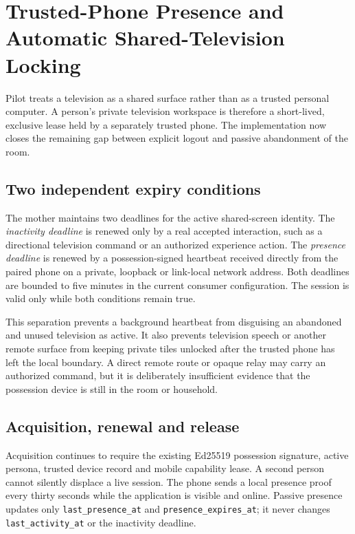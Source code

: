 \section{Trusted-Phone Presence and Automatic Shared-Television Locking}
\label{sec:pilot-mobile-shared-tv-auto-lock}

Pilot treats a television as a shared surface rather than as a trusted personal
computer.  A person's private television workspace is therefore a short-lived,
exclusive lease held by a separately trusted phone.  The implementation now closes
the remaining gap between explicit logout and passive abandonment of the room.

\subsection{Two independent expiry conditions}

The mother maintains two deadlines for the active shared-screen identity.  The
\emph{inactivity deadline} is renewed only by a real accepted interaction, such as a
directional television command or an authorized experience action.  The
\emph{presence deadline} is renewed by a possession-signed heartbeat received
directly from the paired phone on a private, loopback or link-local network address.
Both deadlines are bounded to five minutes in the current consumer configuration.
The session is valid only while both conditions remain true.

This separation prevents a background heartbeat from disguising an abandoned and
unused television as active.  It also prevents television speech or another remote
surface from keeping private tiles unlocked after the trusted phone has left the
local boundary.  A direct remote route or opaque relay may carry an authorized
command, but it is deliberately insufficient evidence that the possession device is
still in the room or household.

\subsection{Acquisition, renewal and release}

Acquisition continues to require the existing Ed25519 possession signature, active
persona, trusted device record and mobile capability lease.  A second person cannot
silently displace a live session.  The phone sends a local presence proof every
thirty seconds while the application is visible and online.  Passive presence
updates only \texttt{last\_presence\_at} and
\texttt{presence\_expires\_at}; it never changes
\texttt{last\_activity\_at} or the inactivity deadline.

